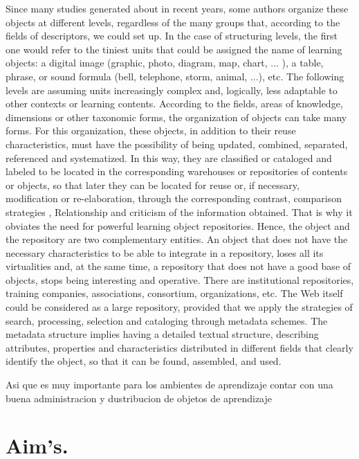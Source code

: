 Since many studies generated about in recent years, some authors organize these objects at different levels, regardless of the many groups that, according to the fields of descriptors, we could set up. In the case of structuring levels, the first one would refer to the tiniest units that could be assigned the name of learning objects: a digital image (graphic, photo, diagram, map, chart, ... ), a table, phrase, or sound formula (bell, telephone, storm, animal, ...), etc. The following levels are assuming units increasingly complex and, logically, less adaptable to other contexts or learning contents. According to the fields, areas of knowledge, dimensions or other taxonomic forms, the organization of objects can take many forms. For this organization, these objects, in addition to their reuse characteristics, must have the possibility of being updated, combined, separated, referenced and systematized. In this way, they are classified or cataloged and labeled to be located in the corresponding warehouses or repositories of contents or objects, so that later they can be located for reuse or, if necessary, modification or re-elaboration, through the corresponding contrast, comparison strategies , Relationship and criticism of the information obtained. That is why it obviates the need for powerful learning object repositories. Hence, the object and the repository are two complementary entities. An object that does not have the necessary characteristics to be able to integrate in a repository, loses all its virtualities and, at the same time, a repository that does not have a good base of objects, stops being interesting and operative. There are institutional repositories, training companies, associations, consortium, organizations, etc. The Web itself could be considered as a large repository, provided that we apply the strategies of search, processing, selection and cataloging through metadata schemes. The metadata structure implies having a detailed textual structure, describing attributes, properties and characteristics distributed in different fields that clearly identify the object, so that it can be found, assembled, and used. 

Asi que es muy importante para los ambientes de aprendizaje contar con una buena administracion y dustribucion de objetos de aprendizaje 


\section{Aim's.}

